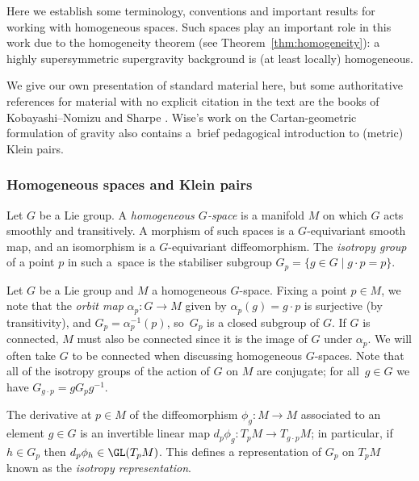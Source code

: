 Here we establish some terminology, conventions and important results for working with homogeneous spaces. Such spaces play an important role in this work due to the homogeneity theorem (see Theorem~\ref{thm:homogeneity}): a highly supersymmetric supergravity background is (at least locally) homogeneous.

We give our own presentation of standard material here, but some authoritative references for material with no explicit citation in the text are the books of Kobayashi--Nomizu \cite{Nomizu1969} and Sharpe \cite{Sharpe1997}. Wise's work \cite{Wise2010} on the Cartan-geometric formulation of gravity also contains a~brief pedagogical introduction to (metric) Klein pairs.
	
\subsubsection{Homogeneous spaces and Klein pairs}

\begin{Definition}
	Let $G$ be a Lie group. A \emph{homogeneous $G$-space} is a manifold $M$ on which $G$ acts smoothly and transitively. A morphism of such spaces is a $G$-equivariant smooth map, and an isomorphism is a $G$-equivariant diffeomorphism.
	The \emph{isotropy group} of a point $p$ in such a~space is the stabiliser subgroup $G_p=\{g\in G \mid {g\cdot p = p} \}$.
\end{Definition}

Let $G$ be a Lie group and $M$ a homogeneous $G$-space. Fixing a point $p\in M$, we note that the \emph{orbit map} $\alpha_p\colon G\to M$ given by $\alpha_p(g) = g\cdot p$ is surjective (by transitivity), and $G_p=\alpha_p^{-1}(p)$, so~$G_p$ is a closed subgroup of $G$. If $G$ is connected, $M$ must also be connected since it is the image of $G$ under $\alpha_p$. We will often take $G$ to be connected when discussing homogeneous $G$-spaces. Note that all of the isotropy groups of the action of $G$ on $M$ are conjugate; for all~${g\in G}$ we have $G_{g\cdot p} = gG_p g^{-1}$.


The derivative at $p\in M$ of the diffeomorphism $\phi_g\colon M\to M$ associated to an element $g\in G$ is an invertible linear map $d_p\phi_g\colon T_pM\to T_{g\cdot p}M$; in particular, if $h\in G_p$ then $d_p\phi_h\in \GL(T_pM)$. This defines a representation of $G_p$ on $T_pM$ known as the \emph{isotropy representation}.

